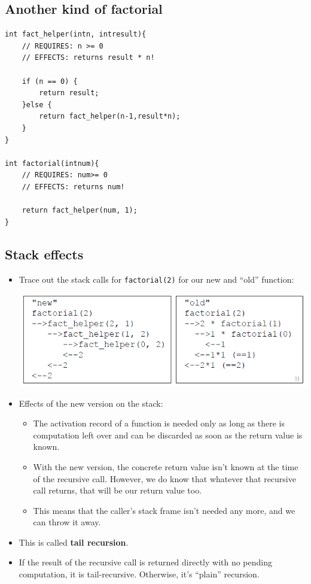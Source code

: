 \subsection{Another kind of factorial}
\begin{lstlisting}[style=C++]
int fact_helper(intn, intresult){
	// REQUIRES: n >= 0
	// EFFECTS: returns result * n!

	if (n == 0) {
		return result;
	}else {
		return fact_helper(n-1,result*n);
	}
}

int factorial(intnum){
	// REQUIRES: num>= 0
	// EFFECTS: returns num!

	return fact_helper(num, 1);
}
\end{lstlisting}

\subsection{Stack effects}
\begin{itemize}
	\item Trace out the stack calls for \lstinline[style=C++]{factorial(2)} for our new and ``old'' function:
	\begin{center}
		\includegraphics[scale=0.7]{sections/lec3/fact.png}	
	\end{center}

	\item Effects of the new version on the stack:
	\begin{itemize}
		\item The activation record of a function is needed only as long as there is computation left over and can be discarded as soon as the return value is known.
		\item With the new version, the concrete return value isn’t known at the time of the recursive call. However, we do know that whatever that recursive call returns, that will be our return value too.
		\item This means that the caller's stack frame isn't needed any more, and we can throw it away.
	\end{itemize}

	\item This is called \textbf{tail recursion}.
	\item If the result of the recursive call is returned directly with no pending computation, it is tail-recursive. Otherwise, it’s ``plain'' recursion.
\end{itemize}
